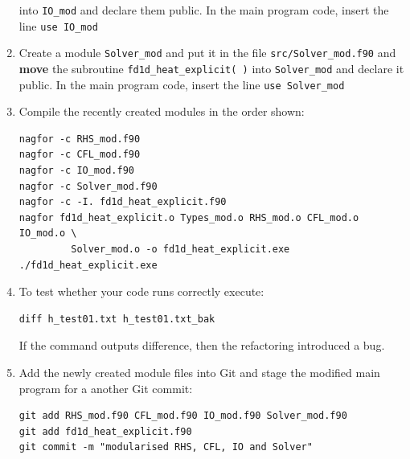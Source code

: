 \documentclass[12pt]{article}
\begin{document}
\begin{enumerate}
  into \texttt{IO\_mod} and declare them public. In the main program code, insert the line \texttt{use IO\_mod}
\item Create a module \texttt{Solver\_mod} and put it in the file \texttt{src/Solver\_mod.f90} and {\bf move} the
  subroutine \texttt{fd1d\_heat\_explicit( )} into \texttt{Solver\_mod} and declare it public. In the main
  program code, insert the line \texttt{use Solver\_mod}
\item Compile the recently created modules in the order shown:
\begin{verbatim}
nagfor -c RHS_mod.f90
nagfor -c CFL_mod.f90
nagfor -c IO_mod.f90
nagfor -c Solver_mod.f90
nagfor -c -I. fd1d_heat_explicit.f90
nagfor fd1d_heat_explicit.o Types_mod.o RHS_mod.o CFL_mod.o IO_mod.o \
         Solver_mod.o -o fd1d_heat_explicit.exe
./fd1d_heat_explicit.exe
\end{verbatim}
\item To test whether your code runs correctly execute:
\begin{verbatim}
diff h_test01.txt h_test01.txt_bak
\end{verbatim}
If the command outputs difference, then the refactoring introduced a bug.
\item Add the newly created module files into Git and stage the modified main program for a
another Git commit:
\begin{verbatim}
git add RHS_mod.f90 CFL_mod.f90 IO_mod.f90 Solver_mod.f90
git add fd1d_heat_explicit.f90
git commit -m "modularised RHS, CFL, IO and Solver"
\end{verbatim}
%
\end{enumerate}
\newpage
\end{document}
